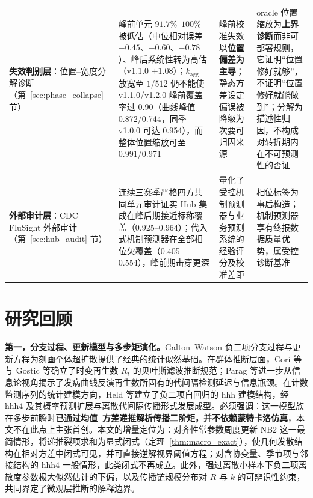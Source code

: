 \documentclass[10pt,UTF8,a4paper,zihao=-4]{ctexart}
\theoremstyle{plain}
\theoremstyle{definition}
\theoremstyle{remark}
\begin{document}
\begin{table}[htbp]
\begin{tabular}{@{}>{\raggedright\arraybackslash}p{2.45cm}>{\raggedright\arraybackslash}p{4.3cm}>{\raggedright\arraybackslash}p{4.1cm}>{\raggedright\arraybackslash}p{4.45cm}@{}}
\addlinespace[2pt]
\textbf{失效判别层}：位置--宽度分解诊断（第~\ref{sec:phase_collapse} 节） & 峰前单元 $91.7\%\text{--}100\%$ 被低估（中位相对误差 $-0.45$、$-0.60$、$-0.78$）、峰后系统性转为高估（v1.1.0 $+1.08$）；$k_{\text{agg}}$ 放宽至 $1/512$ 仍不能使 v1.1.0/v1.2.0 峰前覆盖率过 0.90（曲线峰值 0.872/0.744，同季 v1.0.0 可达 0.954），而整体位置缩放可至 0.991/0.971 & 峰前校准失效以\textbf{位置偏差为主导}；静态方差设定偏误被降级为次要可归因来源 & oracle 位置缩放为\textbf{上界诊断}而非可部署规则，它证明“位置修好就够”，不证明“位置修好就能做到”；分解为描述性归因，不构成对转折期内在不可预测性的否证 \\
\addlinespace[2pt]
\textbf{外部审计层}：CDC FluSight 外部审计（第~\ref{sec:hub_audit} 节） & 连续三赛季严格四方共同单元审计证实 Hub 集成在峰后期接近标称覆盖（0.925--0.964）；代入式机制预测器在全部相位欠覆盖（0.405--0.554），峰前期击穿更深 & 量化了受控机制预测器与业务预测系统的经验评分及校准差距 & 相位标签为事后构造；机制预测器享有终报数据质量优势，属受控诊断基准 \\
\bottomrule
\end{tabular}
\end{table}

\section{研究回顾}\label{sec:review}

\textbf{第一，分支过程、更新模型与多步矩演化。}Galton--Watson 负二项分支过程\citep{athreya1972branching}与更新方程为刻画个体超扩散提供了经典的统计似然基础\citep{lloyd-smith2005superspreading}。在群体推断层面，Cori 等\citep{cori2013framework}与 Gostic 等\citep{gostic2020practical}确立了时变再生数 $R_t$ 的贝叶斯滤波推断规范；Parag 等\citep{parag2020information, parag2022fundamental, parag2022quantifying}进一步从信息论视角揭示了发病曲线反演再生数所固有的代间隔检测延迟与信息瓶颈。在计数监测序列的统计建模方向，Held 等\citep{held2005statistical}建立了负二项自回归的 hhh 建模结构，经 hhh4 及其概率预测扩展\citep{held2017monitoring}与离散代间隔传播形式\citep{bracher2022endemic}发展成型。必须强调：这一模型族在多步前瞻时\textbf{已通过均值--方差递推解析传播二阶矩，并不依赖蒙特卡洛仿真}，本文不在此点上主张首创。本文的增量定位为：对齐性常参数周度更新 NB2 这一最简情形，将递推裂项求和为显式闭式（定理~\ref{thm:macro_exact}），使几何发散结构在相对方差中闭式可见，并可直接逆解视界阈值方程；对含协变量、季节项与邻接结构的 hhh4 一般情形，此类闭式不再成立。此外，强过离散小样本下负二项离散度参数极大似然估计的下偏\citep{lloyd-smith2007fisher}，以及传播链规模分布对 $R$ 与 $k$ 的可辨识性约束\citep{blumberg2013inference}，共同界定了微观层推断的解释边界。
\end{document}
